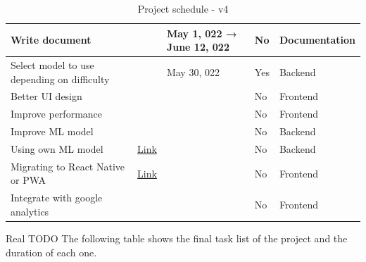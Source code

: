 \begin{table}[H]
{\begin{tabular}{|l|l|l|l|l|}
        \hline Write document &  & May 1, 022 → June 12, 022 & No & Documentation \\
        \hline Select model to use depending on difficulty &  & May 30, 022 & Yes & Backend \\
        \hline Better UI design &  &  & No & Frontend \\
        \hline Improve performance &  &  & No & Frontend \\
        \hline Improve ML model &  &  & No & Backend \\
        \hline Using own ML model & \href{https://github.com/JesusGonzalezA/LearnASL/milestone/10}{Link} &  & No & Backend \\
        \hline Migrating to React Native or PWA & \href{https://github.com/JesusGonzalezA/LearnASL/milestone/9}{Link} &  & No & Frontend \\
        \hline Integrate with google analytics &  &  & No & Frontend \\
        \hline
    \end{tabular}
    }
\caption{Project schedule - v4}
\label{table:planification_real_v4}
\end{table}

Real TODO
The following table shows the final task list of the project and the duration of each one.

